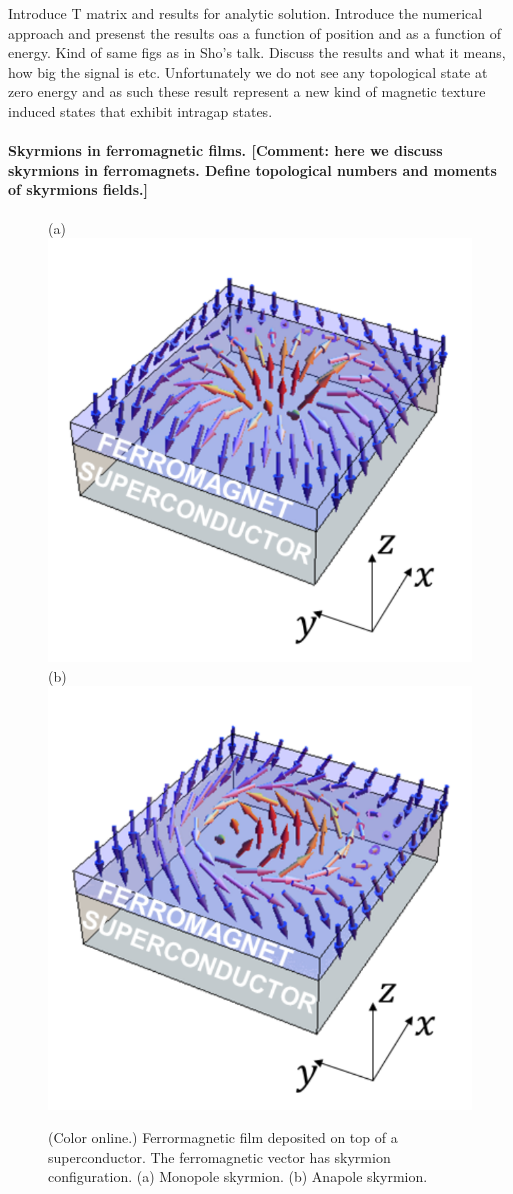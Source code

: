 \documentclass[twocolumn,showpacs,floatfix,nofootinbib,longbibliography]{revtex4-1}
\begin{document}
Introduce T matrix and results for analytic solution.
Introduce the numerical approach and presenst the results oas a function of position and as a function of energy. Kind of same figs as in Sho’s talk.
Discuss the results and what it means, how big the signal is etc. Unfortunately we do not see any topological state at zero energy and as such these result represent a new kind of magnetic texture induced states that exhibit intragap states.



\paragraph*{Skyrmions in ferromagnetic films. [Comment: here we discuss skyrmions in ferromagnets. Define topological numbers and moments of skyrmions fields.]} \label{sec:skyrmion}

\begin{figure} \centering
(a) \includegraphics[width=0.4\linewidth]{SkyrmA}
(b) \includegraphics[width=0.4\linewidth]{SkyrmB}
\caption{(Color online.) Ferrormagnetic film deposited on top of a superconductor. The ferromagnetic vector has skyrmion configuration. (a) Monopole skyrmion.  (b) Anapole skyrmion. } \label{fig:skyrmion}
\end{figure}
\end{document}
